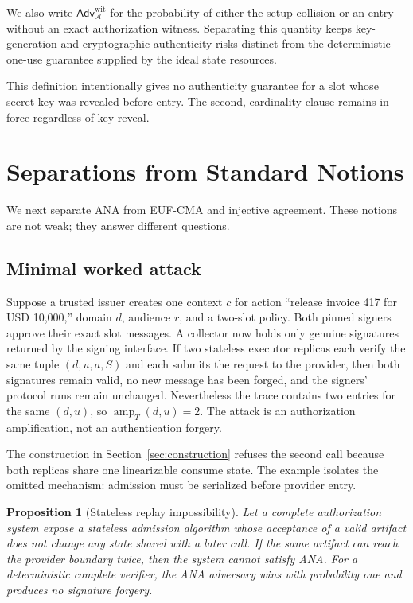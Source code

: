 \documentclass[10pt]{article}
\newtheorem{proposition}{Proposition}
\newcommand{\Adv}{\mathsf{Adv}}
\begin{document}
We also write $\Adv^{\mathrm{wit}}_{\mathcal A}$ for the probability of either
the setup collision or an entry without an exact authorization witness.
Separating this quantity keeps key-generation and cryptographic authenticity
risks distinct from the deterministic one-use guarantee supplied by the ideal
state resources.

This definition intentionally gives no authenticity guarantee for a slot whose
secret key was revealed before entry. The second, cardinality clause remains in
force regardless of key reveal.

\section{Separations from Standard Notions}
\label{sec:separations}

We next separate ANA from EUF-CMA and injective agreement. These notions are not
weak; they answer different questions.

\subsection{Minimal worked attack}

Suppose a trusted issuer creates one context $c$ for action ``release invoice
417 for USD 10,000,'' domain $d$, audience $r$, and a two-slot policy. Both
pinned signers approve their exact slot messages. A collector now holds only
genuine signatures returned by the signing interface. If two stateless
executor replicas each verify the same tuple $(d,u,a,S)$ and each submits the
request to the provider, then both signatures remain valid, no new message has
been forged, and the signers' protocol runs remain unchanged. Nevertheless the
trace contains two entries for the same $(d,u)$, so
$\operatorname{amp}_T(d,u)=2$. The attack is an authorization amplification,
not an authentication forgery.

The construction in Section~\ref{sec:construction} refuses the second call
because both replicas share one linearizable consume state. The example
isolates the omitted mechanism: admission must be serialized before provider
entry.

\begin{proposition}[Stateless replay impossibility]
\label{prop:stateless}
Let a complete authorization system expose a stateless admission algorithm
whose acceptance of a valid artifact does not change any state shared with a
later call. If the same artifact can reach the provider boundary twice, then the
system cannot satisfy ANA. For a deterministic complete verifier, the ANA
adversary wins with probability one and produces no signature forgery.
\end{proposition}
\end{document}
